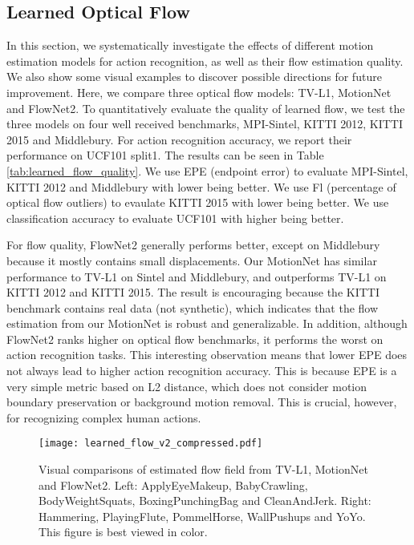 \documentclass[runningheads]{llncs}
\begin{document}
		
		
		
		
		\subsection{Learned Optical Flow} 
		\label{sec:learned_optical_flow}
		In this section, we systematically investigate the effects of different motion estimation models for action recognition, {\color{black}as well as their flow estimation quality}. We also show some visual examples to discover possible directions for future improvement. 
		Here, we compare three optical flow models: TV-L1, MotionNet and FlowNet2. To quantitatively evaluate the quality of learned flow, we test the three models on {\color{black}four} well received benchmarks, MPI-Sintel, {\color{black}KITTI 2012,  KITTI 2015 and Middlebury}. For action recognition accuracy, we report their performance on UCF101 split1. The results can be seen in Table \ref{tab:learned_flow_quality}. {\color{black}We use EPE (endpoint error) to evaluate MPI-Sintel, KITTI 2012 and Middlebury with lower being better. We use Fl (percentage of optical flow outliers) to evaulate KITTI 2015 with lower being better.  We use classification accuracy to evaluate UCF101 with higher being better.}
		
		{ \color{black} For flow quality, FlowNet2 generally performs better, except on Middlebury because it mostly contains small displacements. Our MotionNet has similar performance to TV-L1 on Sintel and Middlebury, and outperforms TV-L1 on KITTI 2012 and KITTI 2015. The result is encouraging because the KITTI benchmark contains real data (not synthetic), which indicates that the flow estimation from our MotionNet is robust and generalizable. In addition, although FlowNet2 ranks higher on optical flow benchmarks, it performs the worst on action recognition tasks.} This interesting observation means that lower EPE does not always lead to higher action recognition accuracy. This is because EPE is a very simple metric based on L2 distance, which does not consider motion boundary preservation or background motion removal. This is crucial, however, for recognizing complex human actions. 
		
		\begin{figure*}[t]
			\centering
			\texttt{[image: learned\_flow\_v2\_compressed.pdf]}
			\caption{Visual comparisons of estimated flow field from TV-L1, MotionNet and FlowNet2. Left: ApplyEyeMakeup, BabyCrawling, BodyWeightSquats, BoxingPunchingBag and CleanAndJerk. Right: Hammering, PlayingFlute, PommelHorse, WallPushups and YoYo. This figure is best viewed in color.}
			\label{fig:learned_flow}
		\end{figure*}
		
\end{document}
